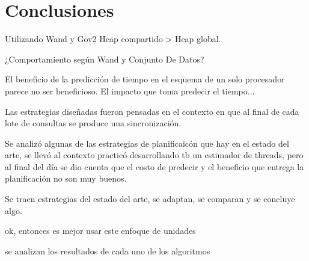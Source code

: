 \chapter{Conclusiones}
\label{cap:conclu}

Utilizando Wand y Gov2 Heap compartido > Heap global.

¿Comportamiento según Wand y Conjunto De Datos? 

El beneficio de la predicción de tiempo en el esquema de un solo procesador parece no ser beneficioso. 
El impacto que toma predecir el tiempo...

Las estrategias diseñadas fueron pensadas en el contexto en que al final de cada lote de consultas se produce una sincronización.

Se analizó algunas de las estrategias de planificaicón que hay en el estado del arte, se llevó al contexto practicó desarrollando tb un estimador de threads, pero al final del día se dio cuenta que el costo de predecir y el beneficio que entrega la planificación no son muy buenos.

Se traen estrategias del estado del arte, se adaptan, se comparan y se concluye algo.

ok, entonces es mejor usar este enfoque de unidades

se analizan los resultados de cada uno de los algoritmos